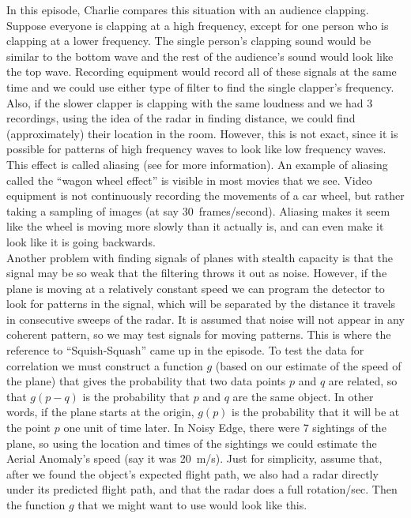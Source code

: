 In this episode, Charlie compares this situation with an audience clapping. Suppose everyone is clapping at a high frequency, except for one person who is clapping at a lower frequency. The single person's clapping sound would be similar to the bottom wave and the rest of the audience's sound would look like the top wave. Recording equipment would record all of these signals at the same time and we could use either type of filter to find the single clapper's frequency. Also, if the slower clapper is clapping with the same loudness and we had 3 recordings, using the idea of the radar in finding distance, we could find (approximately) their location in the room. However, this is not exact, since it is possible for patterns of high frequency waves to look like low frequency waves. This effect is called aliasing (see  for more information). An example of aliasing called the ``wagon wheel effect'' is visible in most movies that we see. Video equipment is not continuously recording the movements of a car wheel, but rather taking a sampling of images (at say 30~frames/second). Aliasing makes it seem like the wheel is moving more slowly than it actually is, and can even make it look like it is going backwards. \\

Another problem with finding signals of planes with stealth capacity is that the signal may be so weak that the filtering throws it out as noise. However, if the plane is moving at a relatively constant speed we can program the detector to look for patterns in the signal, which will be separated by the distance it travels in consecutive sweeps of the radar. It is assumed that noise will not appear in any coherent pattern, so we may test signals for moving patterns. This is where the reference to ``Squish-Squash'' came up in the episode. To test the data for correlation we must construct a function $g$ (based on our estimate of the speed of the plane) that gives the probability that two data points $p$ and $q$ are related, so that $g(p-q)$ is the probability that $p$ and $q$ are the same object. In other words, if the plane starts at the origin, $g(p)$ is the probability that it will be at the point $p$ one unit of time later. In Noisy Edge, there were 7 sightings of the plane, so using the location and times of the sightings we could estimate the Aerial Anomaly's speed (say it was 20~m/s). Just for simplicity, assume that, after we found the object's expected flight path, we also had a radar directly under its predicted flight path, and that the radar does a full rotation/sec. Then the function $g$ that we might want to use would look like this. 


